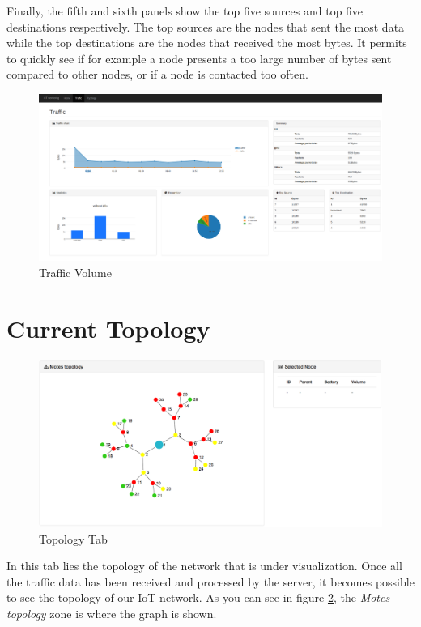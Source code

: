 Finally, the fifth and sixth panels show the top five sources and top five destinations respectively. The top sources are the nodes that sent the most data while the top destinations are the nodes that received the most bytes. It permits to quickly see if for example a node presents a too large number of bytes sent compared to other nodes, or if a node is contacted too often.

\begin{figure}
	\centering
	\includegraphics[width=\textwidth]{res/traffic.png}
	\caption{Traffic Volume}
	\label{fig:tool_traffic}
\end{figure}

\section{Current Topology}

\begin{figure}[!h]
	\centering
	\includegraphics[width=1.1\textwidth]{res/topologyinterface.png}
	\caption{Topology Tab}
	\label{fig:topo}
\end{figure}

In this tab lies the topology of the network that is under visualization. Once all the traffic data has been received and processed by the server, it becomes possible to see the topology of our IoT network. As you can see in figure \ref{fig:topo}, the \textit{Motes topology} zone is where the graph is shown. \\

